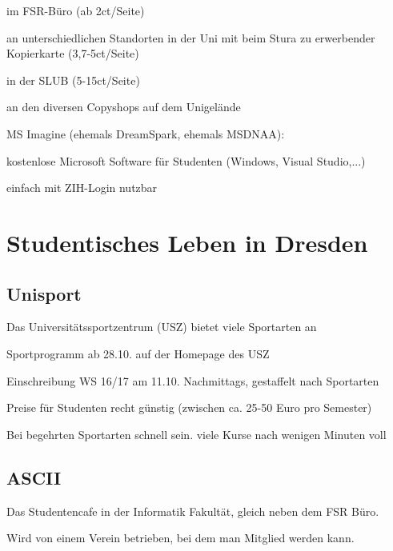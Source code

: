 \documentclass[a4paper,12pt]{report}
\begin{document}
\begin{itemize*}
	\begin{itemize*}
		\item im FSR-Büro (ab 2ct/Seite)
		\item an unterschiedlichen Standorten in der Uni mit beim Stura zu erwerbender Kopierkarte (3,7-5ct/Seite)
		\item in der SLUB (5-15ct/Seite)
		\item an den diversen Copyshops auf dem Unigelände
	\end{itemize*}
	\item MS Imagine (ehemals DreamSpark, ehemals MSDNAA):
	\begin{itemize*}
		\item kostenlose Microsoft Software für Studenten (Windows, Visual Studio,...)
		\item einfach mit ZIH-Login nutzbar
	\end{itemize*}
\end{itemize*}

\section{Studentisches Leben in Dresden}

\subsection{Unisport}
Das Universitätssportzentrum (USZ) bietet viele Sportarten an
\begin{itemize*}
\item Sportprogramm ab 28.10. auf der Homepage des USZ
\item Einschreibung WS 16/17 am 11.10. Nachmittags, gestaffelt nach Sportarten
\item Preise für Studenten recht günstig (zwischen ca. 25-50 Euro pro Semester)
\item Bei begehrten Sportarten schnell sein. viele Kurse nach wenigen Minuten voll
\end{itemize*}

\subsection{ASCII}
\begin{itemize*}
\item Das Studentencafe in der Informatik Fakultät, gleich neben dem FSR Büro.
\item Wird von einem Verein betrieben, bei dem man Mitglied werden kann.
\end{itemize*}
\end{document}
